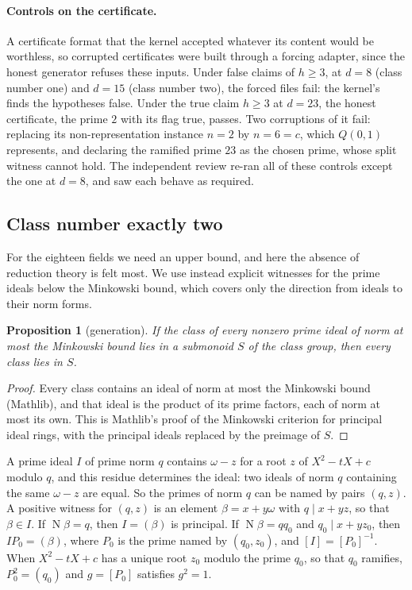 \documentclass[11pt]{article}
\newtheorem{proposition}[theorem]{Proposition}
\theoremstyle{definition}
\newcommand{\Nm}{\operatorname{N}}
\begin{document}
{\paragraph{Controls on the certificate.} A certificate format that the kernel accepted whatever its content would be worthless, so corrupted certificates were built through a forcing adapter, since the honest generator refuses these inputs. Under false claims of $h \ge 3$, at $d = 8$ (class number one) and $d = 15$ (class number two), the forced files fail: the kernel's  finds the hypotheses false. Under the true claim $h \ge 3$ at $d = 23$, the honest certificate, the prime $2$ with its flag true, passes. Two corruptions of it fail: replacing its non-representation instance $n = 2$ by $n = 6 = c$, which $Q(0, 1)$ represents, and declaring the ramified prime $23$ as the chosen prime, whose split witness cannot hold. The independent review re-ran all of these controls except the one at $d = 8$, and saw each behave as required.

\subsection{Class number exactly two}\label{sec:classtwo}

For the eighteen fields we need an upper bound, and here the absence of reduction theory is felt most. We use instead explicit witnesses for the prime ideals below the Minkowski bound, which covers only the direction from ideals to their norm forms.

\begin{proposition}[generation]\label{prop:generation}
If the class of every nonzero prime ideal of norm at most the Minkowski bound lies in a submonoid $S$ of the class group, then every class lies in $S$.
\end{proposition}

\begin{proof}
Every class contains an ideal of norm at most the Minkowski bound (Mathlib), and that ideal is the product of its prime factors, each of norm at most its own. This is Mathlib's proof of the Minkowski criterion for principal ideal rings, with the principal ideals replaced by the preimage of $S$.
\end{proof}

A prime ideal $I$ of prime norm $q$ contains $\omega - z$ for a root $z$ of $X^2 - tX + c$ modulo $q$, and this residue determines the ideal: two ideals of norm $q$ containing the same $\omega - z$ are equal. So the primes of norm $q$ can be named by pairs $(q, z)$. A positive witness for $(q, z)$ is an element $\beta = x + y\omega$ with $q \mid x + yz$, so that $\beta \in I$. If $\Nm\beta = q$, then $I = (\beta)$ is principal. If $\Nm\beta = qq_0$ and $q_0 \mid x + yz_0$, then $IP_0 = (\beta)$, where $P_0$ is the prime named by $(q_0, z_0)$, and $[I] = [P_0]^{-1}$. When $X^2 - tX + c$ has a unique root $z_0$ modulo the prime $q_0$, so that $q_0$ ramifies, $P_0^2 = (q_0)$ and $g = [P_0]$ satisfies $g^2 = 1$.

}
\end{document}
